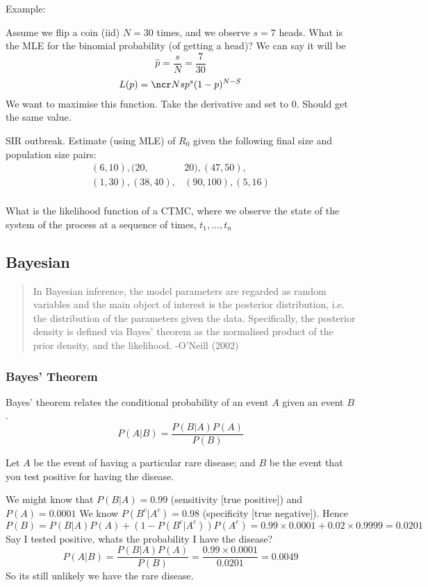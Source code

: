 \documentclass{X:/Documents/Coding/Latex/myassignment}
\begin{document}
Example:

Assume we flip a coin (iid) $N=30$ times, and we observe $s=7$ heads. What is the MLE for the binomial probability (of getting a head)?
We can say it will be
\[\hat{p} = \frac s N = \frac7{30}\]
\begin{align*}
    L(p) = \ncr Ns p^s (1-p)^{N-S}\\    
\end{align*}
We want to maximise this function. Take the derivative and set to $0$. Should get the same value.


SIR outbreak. Estimate (using MLE) of $R_0$ given the following final size and population size pairs:
\begin{align*}
    (6,10), (20,&20), (47,50),\\
    (1,30), (38,40), & (90,100), (5,16)\\
\end{align*}




What is the likelihood function of a CTMC, where we observe the state of the system of the process at a sequence of times, $t_1,\ldots,t_n$


\subsection{Bayesian}
\begin{verse}
\noindent
{\centering
In Bayesian inference, the model parameters are regarded as random variables and the main object of interest is the posterior distribution, i.e. the distribution of the parameters given the data. Specifically, the posterior density is defined via Bayes' theorem as the normalised product of the prior density, and the likelihood.
-O'Neill (2002)
}
\end{verse}

\subsubsection{Bayes' Theorem}
Bayes' theorem relates the conditional probability of an event $A$ given an event $B$.
\[P(A|B) = \frac{P(B|A)P(A)}{P(B)}\]

Let $A$ be the event of having a particular rare disease; and $B$ be the event that you test positive for having the disease.


We might know that $P(B|A) = 0.99$ (sensitivity [true positive]) and $P(A) = 0.0001$ 
We know $P(B^c | A^c) = 0.98$ (specificity [true negative]).
Hence
\[P(B) = P(B|A) P(A) + (1-P(B^c|A^c))P(A^c) = 0.99 \times 0.0001 + 0.02 \times 0.9999 = 0.0201\]
Say I tested positive, whats the probability I have the disease?
\[P(A|B) = \frac{P(B|A)P(A)}{P(B)} = \frac{0.99\times 0.0001}{0.0201} = 0.0049\]
So its still unlikely we have the rare disease.
\end{document}
